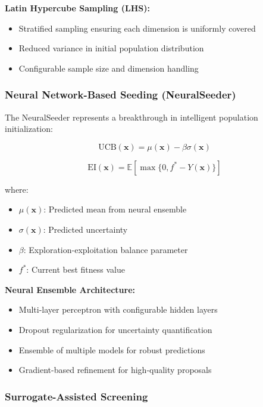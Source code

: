 \documentclass[12pt,a4paper]{article}
\begin{document}
\textbf{Latin Hypercube Sampling (LHS):}
\begin{itemize}
    \item Stratified sampling ensuring each dimension is uniformly covered
    \item Reduced variance in initial population distribution
    \item Configurable sample size and dimension handling
\end{itemize}

\subsubsection{Neural Network-Based Seeding (NeuralSeeder)}

The NeuralSeeder represents a breakthrough in intelligent population initialization:

\begin{equation}
\text{UCB}(\mathbf{x}) = \mu(\mathbf{x}) - \beta \sigma(\mathbf{x})
\end{equation}

\begin{equation}
\text{EI}(\mathbf{x}) = \mathbb{E}[\max\{0, f^* - Y(\mathbf{x})\}]
\end{equation}

where:
\begin{itemize}
    \item $\mu(\mathbf{x})$: Predicted mean from neural ensemble
    \item $\sigma(\mathbf{x})$: Predicted uncertainty
    \item $\beta$: Exploration-exploitation balance parameter
    \item $f^*$: Current best fitness value
\end{itemize}

\textbf{Neural Ensemble Architecture:}
\begin{itemize}
    \item Multi-layer perceptron with configurable hidden layers
    \item Dropout regularization for uncertainty quantification
    \item Ensemble of multiple models for robust predictions
    \item Gradient-based refinement for high-quality proposals
\end{itemize}

\subsubsection{Surrogate-Assisted Screening}
\end{document}
